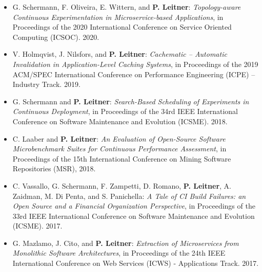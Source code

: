 \documentclass[paper=letter,fontsize=11pt]{scrartcl} %
\begin{document}
\begin{itemize}
\item G. Schermann, F. Oliveira, E. Wittern, and \textbf{P. Leitner}: \emph{Topology-aware Continuous Experimentation in Microservice-based Applications}, in Proceedings of the 2020 International Conference on Service Oriented Computing (ICSOC). 2020. 
	\item V. Holmqvist, J. Nilsfors, and \textbf{P. Leitner}: \emph{Cachematic -- Automatic Invalidation in Application-Level Caching Systems}, in Proceedings of the 2019 ACM/SPEC  International Conference on Performance Engineering (ICPE) -- Industry Track. 2019. 
	\item G. Schermann and \textbf{P. Leitner}: \emph{Search-Based Scheduling of Experiments in Continuous Deployment}, in Proceedings of the 34rd IEEE International Conference on Software Maintenance and Evolution (ICSME). 2018. 
	\item C. Laaber and \textbf{P. Leitner}: \emph{An Evaluation of Open-Source Software Microbenchmark Suites for Continuous Performance Assessment}, in Proceedings of the 15th International Conference on Mining Software Repositories (MSR), 2018. 
	\item C. Vassallo, G. Schermann, F. Zampetti, D. Romano, \textbf{P. Leitner}, A. Zaidman, M. Di Penta, and S. Panichella: \emph{A Tale of CI Build Failures: an Open Source and a Financial Organization Perspective}, in Proceedings of the 33rd IEEE International Conference on Software Maintenance and Evolution (ICSME). 2017. 
	\item G. Mazlamo, J. Cito, and \textbf{P. Leitner}: \emph{Extraction of Microservices from Monolithic Software Architectures}, in Proceedings of the 24th IEEE International Conference on Web Services (ICWS) - Applications Track. 2017. 

\end{itemize}
\end{document}
